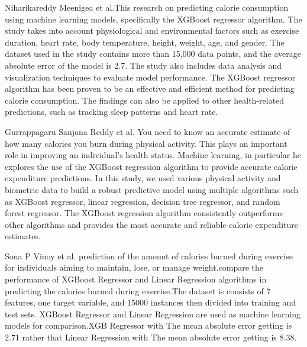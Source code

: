 \documentclass[conference]{IEEEtran}
\begin{document}
\newline
Niharikareddy Meenigea et al.\textcolor{blue}{\citep{Niharikareddy7}}This research on predicting calorie consumption using  machine learning models, specifically the XGBoost regressor algorithm. The study takes into account physiological and environmental factors such as exercise duration, heart rate, body temperature, height, weight, age, and gender. The dataset used in the study contains more than 15,000 data points, and the average absolute error of the model is 2.7. The study also includes data analysis and visualization techniques to evaluate model performance. The XGBoost regressor algorithm has been proven to be an effective and efficient method for predicting calorie consumption. The  findings can also be applied to other health-related predictions, such as tracking sleep patterns and heart rate.
\newline


\newline
Gurrappagaru Sanjana Reddy et al.\textcolor{blue}{\citep{Gurrappagaru8}} You need to know an accurate estimate of how many calories you burn during physical activity. This plays an important role in improving an individual's health status. Machine learning, in particular he explores the use of  the XGBoost regression algorithm to provide accurate calorie expenditure predictions. In this study, we used various physical activity and biometric data to build a robust predictive model using multiple algorithms such as XGBoost regressor, linear regression, decision tree regressor, and random forest regressor. The XGBoost regression algorithm consistently outperforms other algorithms and provides the most accurate and reliable calorie expenditure estimates.
\newline

\newline
Sona P Vinoy et al.\textcolor{blue}{\citep{Binumon9}}
prediction of the amount of calories burned during exercise for individuals aiming to maintain, lose, or manage weight.compare the performance of XGBoost Regressor and Linear Regression algorithms in predicting the calories burned during exercise.The dataset is consists of 7 features, one target variable, and 15000 instances then divided into training and test sets. XGBoost Regressor and Linear Regression are used as machine learning models for comparison.XGB Regressor with The mean absolute error getting is 2.71 rather that Linear Regression with The mean absolute error getting is 8.38.
\newline
\end{document}
